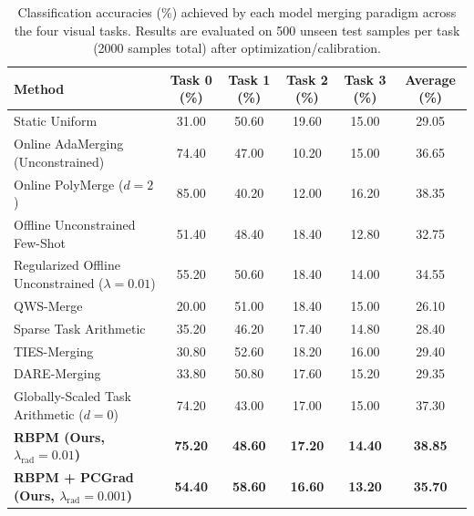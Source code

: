 \begin{table}[t]
\caption{Classification accuracies (\%) achieved by each model merging paradigm across the four visual tasks. Results are evaluated on 500 unseen test samples per task (2000 samples total) after optimization/calibration.}
\label{tab:accuracy_results}
\vskip 0.15in
\begin{center}
\begin{small}
\begin{sc}
\begin{tabular}{lccccc}
\toprule
Method & Task 0 (\%) & Task 1 (\%) & Task 2 (\%) & Task 3 (\%) & \textbf{Average (\%) } \\
\midrule
Static Uniform & 31.00 & 50.60 & 19.60 & 15.00 & 29.05 \\
Online AdaMerging (Unconstrained) & 74.40 & 47.00 & 10.20 & 15.00 & 36.65 \\
Online PolyMerge ($d = 2$) & 85.00 & 40.20 & 12.00 & 16.20 & 38.35 \\
Offline Unconstrained Few-Shot & 51.40 & 48.40 & 18.40 & 12.80 & 32.75 \\
Regularized Offline Unconstrained ($\lambda = 0.01$) & 55.20 & 50.60 & 18.40 & 14.00 & 34.55 \\
QWS-Merge & 20.00 & 51.00 & 18.40 & 15.00 & 26.10 \\
Sparse Task Arithmetic & 35.20 & 46.20 & 17.40 & 14.80 & 28.40 \\
TIES-Merging & 30.80 & 52.60 & 18.20 & 16.00 & 29.40 \\
DARE-Merging & 33.80 & 50.80 & 17.60 & 15.20 & 29.35 \\
Globally-Scaled Task Arithmetic ($d=0$) & 74.20 & 43.00 & 17.00 & 15.00 & 37.30 \\
\textbf{RBPM (Ours, $\lambda_{\text{rad}} = 0.01$)} & \textbf{75.20} & \textbf{48.60} & \textbf{17.20} & \textbf{14.40} & \textbf{38.85} \\
\textbf{RBPM + PCGrad (Ours, $\lambda_{\text{rad}} = 0.001$)} & \textbf{54.40} & \textbf{58.60} & \textbf{16.60} & \textbf{13.20} & \textbf{35.70} \\
\bottomrule
\end{tabular}
\end{sc}
\end{small}
\end{center}
\vskip -0.1in
\end{table}

